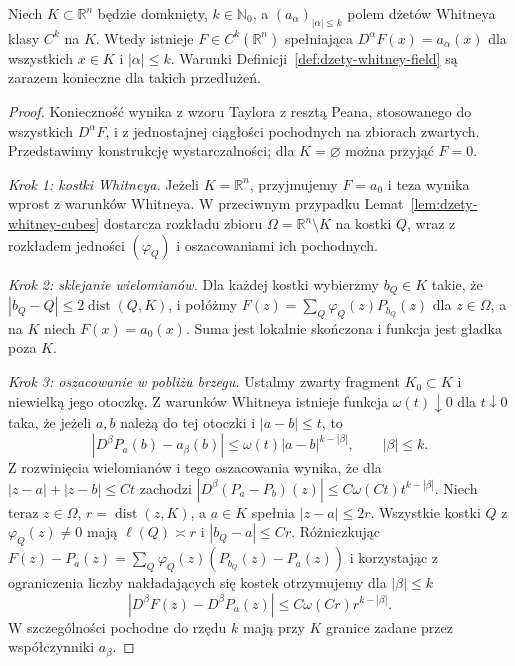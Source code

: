 \begin{twierdzenie}
\label{thm:dzety-whitney-extension}
Niech $K\subset\mathbb R^n$ będzie domknięty,
$k\in\mathbb N_0$, a $(a_\alpha)_{|\alpha|\le k}$
polem dżetów Whitneya klasy $C^k$ na $K$.
Wtedy istnieje $F\in C^k(\mathbb R^n)$ spełniająca
$D^\alpha F(x)=a_\alpha(x)$ dla wszystkich
$x\in K$ i $|\alpha|\le k$.
Warunki Definicji~\ref{def:dzety-whitney-field} są
zarazem konieczne dla takich przedłużeń.
\end{twierdzenie}

\begin{proof}
Konieczność wynika z wzoru Taylora z resztą Peana,
stosowanego do wszystkich $D^\alpha F$, i z jednostajnej
ciągłości pochodnych na zbiorach zwartych.
Przedstawimy konstrukcję wystarczalności; dla $K=\varnothing$
można przyjąć $F=0$.

\emph{Krok 1: kostki Whitneya.}
Jeżeli $K=\mathbb R^n$, przyjmujemy $F=a_0$
i teza wynika wprost z warunków Whitneya.
W przeciwnym przypadku Lemat~\ref{lem:dzety-whitney-cubes}
dostarcza rozkładu zbioru
$\Omega=\mathbb R^n\setminus K$
na kostki $Q$, wraz z rozkładem jedności
$(\varphi_Q)$ i oszacowaniami ich pochodnych.

\emph{Krok 2: sklejanie wielomianów.}
Dla każdej kostki wybierzmy $b_Q\in K$ takie, że
$|b_Q-Q|\le2\operatorname{dist}(Q,K)$, i połóżmy
$F(z)=\sum_Q\varphi_Q(z)P_{b_Q}(z)$ dla $z\in\Omega$,
a na $K$ niech $F(x)=a_0(x)$. Suma jest lokalnie skończona
i funkcja jest gładka poza $K$.

\emph{Krok 3: oszacowanie w pobliżu brzegu.}
Ustalmy zwarty fragment $K_0\subset K$ i niewielką
jego otoczkę. Z warunków Whitneya istnieje funkcja
$\omega(t)\downarrow0$ dla $t\downarrow0$ taka, że
jeżeli $a,b$ należą do tej otoczki i $|a-b|\le t$, to
\[
 |D^\beta P_a(b)-a_\beta(b)|
 \le\omega(t)|a-b|^{k-|\beta|},\qquad |\beta|\le k.
\]
Z rozwinięcia wielomianów i tego oszacowania wynika,
że dla $|z-a|+|z-b|\le Ct$ zachodzi
$|D^\beta(P_a-P_b)(z)|\le C\omega(Ct)t^{k-|\beta|}$.
Niech teraz $z\in\Omega$, $r=\operatorname{dist}(z,K)$,
a $a\in K$ spełnia $|z-a|\le2r$. Wszystkie kostki
$Q$ z $\varphi_Q(z)\ne0$ mają $\ell(Q)\asymp r$
i $|b_Q-a|\le Cr$. Różniczkując
$F(z)-P_a(z)=\sum_Q\varphi_Q(z)(P_{b_Q}(z)-P_a(z))$
i korzystając z ograniczenia liczby nakładających się
kostek otrzymujemy dla $|\beta|\le k$
\[
 |D^\beta F(z)-D^\beta P_a(z)|
 \le C\omega(Cr)r^{k-|\beta|}.
\]
W szczególności pochodne do rzędu $k$ mają przy $K$
granice zadane przez współczynniki $a_\beta$.


\end{proof}

